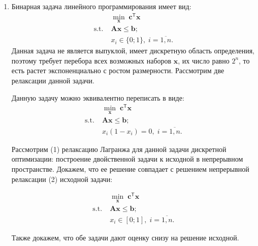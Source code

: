 \documentclass[a4paper,12pt]{article}
\renewcommand{\leq}{\leqslant}
\renewcommand{\top}{\mathsf{T}}
\begin{document}
	\begin{enumerate}
	\item Бинарная задача линейного программирования имеет вид:
	\begin{equation*}
		\begin{aligned}
			& \min\limits_{\mathbf{x}}\; \mathbf{c}^\top \mathbf{x} \\
			\text{s.t.}\; & \mathbf{A}\mathbf{x} \leq \mathbf{b};\\
			& x_i\in\{0;1\},\;i=\overline{1,n}.
		\end{aligned}
	\end{equation*}
	Данная задача не является выпуклой, имеет дискретную область определения, поэтому требует перебора всех возможных наборов $\mathbf{x}$, их число равно $2^n$, то есть растет экспоненциально с ростом размерности. Рассмотрим две релаксации данной задачи.
	
	Данную задачу можно эквивалентно переписать в виде:
	\begin{equation*}
		\begin{aligned}
			& \min\limits_{\mathbf{x}}\; \mathbf{c}^\top \mathbf{x} \\
			\text{s.t.}\; & \mathbf{A}\mathbf{x} \leq \mathbf{b};\\
			& x_i(1-x_i) = 0,\;i=\overline{1,n}.
		\end{aligned}
	\end{equation*}
	
 	Рассмотрим (1) релаксацию Лагранжа для данной задачи дискретной оптимизации: построение двойственной задачи к исходной в непрерывном пространстве. Докажем, что ее решение совпадает с решением непрерывной релаксации (2) исходной задачи:
	 
	\begin{equation*}
		\begin{aligned}
			& \min\limits_{\mathbf{x}}\; \mathbf{c}^\top \mathbf{x} \\
			\text{s.t.}\; & \mathbf{A}\mathbf{x} \leq \mathbf{b};\\
			& x_i\in[0;1],\;i=\overline{1,n}.
		\end{aligned}
	\end{equation*}
	
	Также докажем, что обе задачи дают оценку снизу на решение исходной.
	

\end{enumerate}
\end{document}

